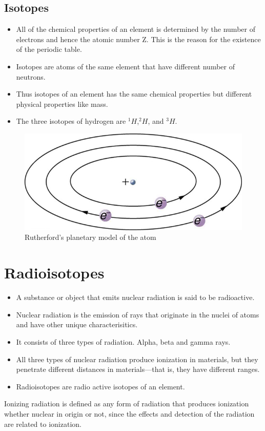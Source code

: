 \documentclass[12pt]{book}
\begin{document}
\section{Isotopes}
\begin{itemize}
\item All of the chemical properties of an element is determined by the number of electrons and hence the atomic number Z. This is the reason for the existence of the periodic table.
\item Isotopes are atoms of the same element that have different number of neutrons.
\item Thus isotopes of an element has the same chemical properties but different physical properties like mass.
\item The three isotopes of hydrogen are $^1H$,$^2H$, and $^3H$.
\end{itemize}

\begin{figure}
\centering
\includegraphics[scale=0.5]{rutherford-atom.jpeg}
\caption{Rutherford’s planetary model of the atom}
\end{figure}
\chapter{Radioisotopes}

\begin{itemize}
	\item A substance or object that emits nuclear radiation is said to be radioactive.
	\item Nuclear radiation is the emission of rays that originate in the nuclei of atoms and have other unique characterisitics.
	\item It consists of three types of radiation. Alpha, beta and gamma rays.
	\item All three types of nuclear radiation produce ionization in materials, but they penetrate different distances in materials—that is, they have different ranges.
	\item Radioisotopes are radio active isotopes of an element.
\end{itemize}
\begin{tcolorbox}[title=Ionizing radiation]
Ionizing radiation is defined as any form of radiation that produces ionization whether nuclear in origin or not, since the effects and detection of the radiation are related to ionization.
\end{tcolorbox}
\end{document}
